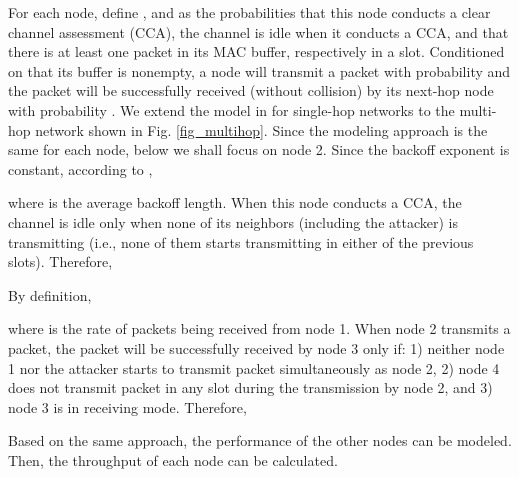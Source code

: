 \documentclass[10pt,journal,cspaper,compsoc]{IEEEtran}
\begin{document}
For each node, define ,  and  as the probabilities that this node conducts a clear channel assessment (CCA), the channel is idle when it conducts a CCA, and that there is at least one packet in its MAC buffer, respectively in a slot. Conditioned on that its buffer is nonempty, a node will transmit a packet with probability  and the packet will be successfully received (without collision) by its next-hop node with probability . We extend the model in \cite{ling2008renewal} for single-hop networks to the multi-hop network shown in Fig. \ref{fig_multihop}. Since the modeling approach is the same for each node, below we shall focus on node 2. Since the backoff exponent is constant, according to \cite{ling2008renewal},

where  is the average backoff length. When this node conducts a CCA, the channel is idle only when none of its neighbors (including the attacker) is transmitting (i.e., none of them starts transmitting in either of the previous  slots). Therefore,

By definition,

where  is the rate of packets being received from node 1. When node 2 transmits a packet, the packet will be successfully received by node 3 only if: 1) neither node 1 nor the attacker starts to transmit packet simultaneously as node 2, 2) node 4 does not transmit packet in any slot during the transmission by node 2, and 3) node 3 is in receiving mode. Therefore,


Based on the same approach, the performance of the other nodes can be modeled. Then, the throughput of each node can be calculated.
\end{document}
